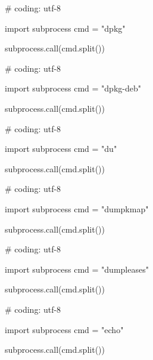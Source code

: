 \begin{mylisting}[label={lst:acpid},language=sh,caption=dpkg]

# coding: utf-8

import subprocess
cmd = "dpkg"

subprocess.call(cmd.split())

\end{mylisting}

\begin{mylisting}[label={lst:acpid},language=sh,caption=dpkg-deb]

# coding: utf-8

import subprocess
cmd = "dpkg-deb"

subprocess.call(cmd.split())

\end{mylisting}

\begin{mylisting}[label={lst:acpid},language=sh,caption=du]

# coding: utf-8

import subprocess
cmd = "du"

subprocess.call(cmd.split())

\end{mylisting}

\begin{mylisting}[label={lst:acpid},language=sh,caption=dumpkmap]

# coding: utf-8

import subprocess
cmd = "dumpkmap"

subprocess.call(cmd.split())

\end{mylisting}

\begin{mylisting}[label={lst:acpid},language=sh,caption=dumpleases]

# coding: utf-8

import subprocess
cmd = "dumpleases"

subprocess.call(cmd.split())

\end{mylisting}

\begin{mylisting}[label={lst:acpid},language=sh,caption=echo]

# coding: utf-8

import subprocess
cmd = "echo"

subprocess.call(cmd.split())

\end{mylisting}

